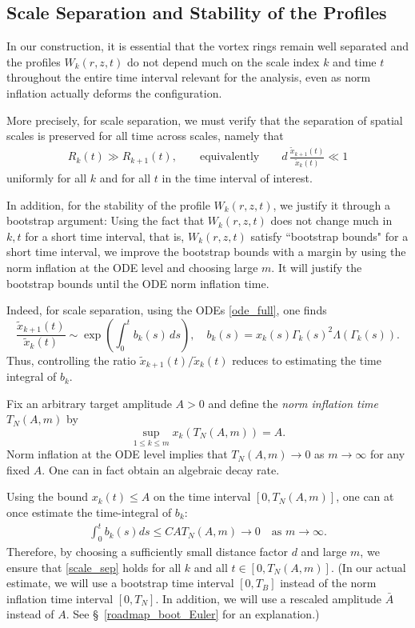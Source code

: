 \documentclass[reqno,11pt]{amsart}
\begin{document}
\subsection{Scale Separation and Stability of the Profiles}
\label{subsec:scale_sep}

In our construction, it is essential that the vortex rings remain well separated
and the profiles $W_k(r,z,t)$ do not depend much on the scale index $k$ and time $t$
throughout the entire time interval relevant for the analysis, even as norm
inflation actually deforms the configuration. 

More precisely, for scale separation, we must verify that the
separation of spatial scales is preserved for all time across scales, namely that
\begin{align}
\label{scale_sep}
    R_k(t) \gg R_{k+1}(t),
    \qquad\text{equivalently}\qquad
    d\,\frac{\tilde x_{k+1}(t)}{\tilde x_k(t)} \ll 1
\end{align}
uniformly for all $k$ and for all $t$ in the time interval of interest. 



In addition, for the stability of the profile $W_k(r,z,t)$, we justify it through a bootstrap argument: Using the fact that $W_k(r,z,t)$ does not change much in $k,t$ for a short time interval, that is, $W_k(r,z,t)$ satisfy ``bootstrap bounds"  for a short time interval, we improve the bootstrap bounds with a margin by using the norm inflation at the ODE level and choosing large $m$. 
It will justify the bootstrap bounds until the ODE norm inflation time.

Indeed, for scale separation, using the ODEs \eqref{ode_full}, one finds
\[
    \frac{\tilde x_{k+1}(t)}{\tilde x_k(t)}
    \sim
    \exp\!\left(
        \int_0^t
        b_k(s)
        \,ds
    \right), \quad b_k(s)= x_k(s) \Gamma_k(s)^2 \Lambda (\Gamma_k(s)).
\]
Thus, controlling the ratio $\tilde x_{k+1}(t)/\tilde x_k(t)$ reduces to estimating
the time integral of $b_k$.

Fix an arbitrary target amplitude $A>0$ and define the \emph{norm inflation time}
$T_N(A,m)$ by
\[
    \sup_{1\le k\le m} x_k(T_N(A,m)) = A.
\]
Norm inflation at the ODE level implies that $T_N(A,m)\to 0$ as $m\to\infty$ for any
fixed $A$. One can in fact obtain an algebraic decay rate.

Using the bound $x_k(t) \leq A$ on the time interval $[0,T_N(A,m)]$, one can at once estimate the time-integral of $b_k$:
    \begin{align}
    \label{small_time_int_b}
        \int_0^t b_k(s) ds \leq C A T_N(A,m)\to 0\quad \text{as }m\to\infty.
    \end{align}
Therefore, by choosing a sufficiently small distance factor $d$ and large $m$,
we ensure that \eqref{scale_sep} holds
for all $k$ and all $t\in[0,T_N(A,m)]$. (In our actual estimate, we will use a bootstrap time interval $[0,T_B]$ instead of the norm inflation time interval $[0,T_N]$. In addition, we will use a rescaled amplitude $\bar A$ instead of $A$. See \S~\ref{roadmap_boot_Euler} for an explanation.)
\end{document}
